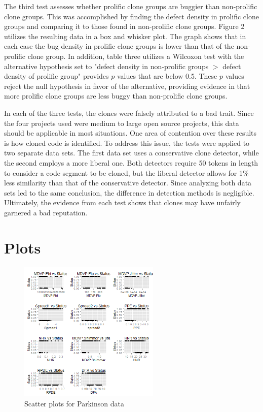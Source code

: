 \documentclass{article}
\begin{document}
The third test assesses whether prolific clone groups are buggier than non-prolific clone groups.
This was accomplished by finding the defect density in prolific clone groups and comparing it to
those found in non-prolific clone groups. Figure 2 utilizes the resulting data in a box and whisker
plot. The graph shows that in each case the bug density in prolific clone groups is lower than that
of the non-prolific clone group. In addition, table three utilizes a Wilcoxon test with the alternative
hypothesis set to "defect density in non-prolific groups $>$ defect density of prolific group" provides
$p$ values that are below 0.5. These $p$ values reject the null hypothesis in favor of the alternative,
providing evidence in that more prolific clone groups are less buggy than non-prolific clone groups.

In each of the three tests, the clones were falsely attributed to a bad trait. Since the four
projects used were medium to large open source projects, this data should be applicable
in most situations. One area of contention over these results is how cloned code is identified.
To address this issue, the tests were applied to two separate data sets. The first data set
uses a conservative clone detector, while the second employs a more liberal one. Both detectors
require 50 tokens in length to consider a code segment to be cloned, but the liberal detector
allows for 1\% less similarity than that of the conservative detector. Since analyzing both
data sets led to the same conclusion, the difference in detection methods is negligible. Ultimately,
the evidence from each test shows that clones may have unfairly garnered a bad reputation.

\pagebreak

\appendix
\section{Plots}
\begin{figure}[h]
  \centering
  \includegraphics[width=0.6\textwidth]{figures/parkinson.png}
  \caption{Scatter plots for Parkinson data}
  \label{fig:parkinson_scatters}
\end{figure}
\end{document}
